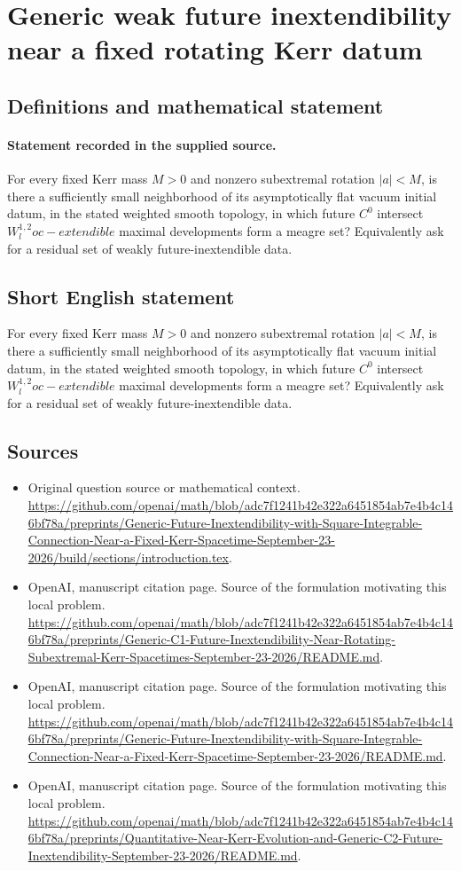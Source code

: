\documentclass[11pt]{article}
\begin{document}
\section*{Generic weak future inextendibility near a fixed rotating Kerr datum}\label{30007238}
\subsection{Definitions and mathematical statement}
\paragraph{Statement recorded in the supplied source.}
For every fixed Kerr mass $M>0$ and nonzero subextremal rotation $|a|<M$, is there a sufficiently small neighborhood of its asymptotically flat vacuum initial datum, in the stated weighted smooth topology, in which future $C^0$ intersect $W^{1,2}_loc-extendible$ maximal developments form a meagre set? Equivalently ask for a residual set of weakly future-inextendible data.
\subsection{Short English statement}
For every fixed Kerr mass $M>0$ and nonzero subextremal rotation $|a|<M$, is there a sufficiently small neighborhood of its asymptotically flat vacuum initial datum, in the stated weighted smooth topology, in which future $C^0$ intersect $W^{1,2}_loc-extendible$ maximal developments form a meagre set? Equivalently ask for a residual set of weakly future-inextendible data.
\subsection{Sources}
\begin{itemize}
\item[S1] Original question source or mathematical context.
\url{https://github.com/openai/math/blob/adc7f1241b42e322a6451854ab7e4b4c146bf78a/preprints/Generic-Future-Inextendibility-with-Square-Integrable-Connection-Near-a-Fixed-Kerr-Spacetime-September-23-2026/build/sections/introduction.tex}.
\item[S2] OpenAI, manuscript citation page. Source of the formulation motivating this local problem.
\url{https://github.com/openai/math/blob/adc7f1241b42e322a6451854ab7e4b4c146bf78a/preprints/Generic-C1-Future-Inextendibility-Near-Rotating-Subextremal-Kerr-Spacetimes-September-23-2026/README.md}.
\item[S3] OpenAI, manuscript citation page. Source of the formulation motivating this local problem.
\url{https://github.com/openai/math/blob/adc7f1241b42e322a6451854ab7e4b4c146bf78a/preprints/Generic-Future-Inextendibility-with-Square-Integrable-Connection-Near-a-Fixed-Kerr-Spacetime-September-23-2026/README.md}.
\item[S4] OpenAI, manuscript citation page. Source of the formulation motivating this local problem.
\url{https://github.com/openai/math/blob/adc7f1241b42e322a6451854ab7e4b4c146bf78a/preprints/Quantitative-Near-Kerr-Evolution-and-Generic-C2-Future-Inextendibility-September-23-2026/README.md}.
\end{itemize}
\end{document}
